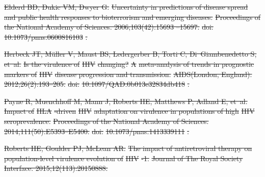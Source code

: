 \documentclass[10pt,letterpaper]{article}
\providecommand{\DIFdeltex}[1]{{\protect\color{red}\sout{#1}}}                      %
\providecommand{\DIFaddbegin}{} %
\providecommand{\DIFaddend}{} %
\providecommand{\DIFdelend}{} %
\providecommand{\DIFdel}[1]{\texorpdfstring{\DIFdeltex{#1}}{}} %
\newcommand{\DIFaddincludegraphics}[2][]{{\color{blue}\fbox{\DIFOincludegraphics[#1]{#2}}}} %
\DeclareRobustCommand{\DIFaddbegin}{\DIFOaddbegin \let\includegraphics\DIFaddincludegraphics} %
\DeclareRobustCommand{\DIFaddend}{\DIFOaddend \let\includegraphics\DIFOincludegraphics} %
\DeclareRobustCommand{\DIFdelend}{\DIFOaddend \let\includegraphics\DIFOincludegraphics} %
\begin{document}
\DIFdel{Elderd BD, Dukic VM, Dwyer G.
}%
\DIFdel{Uncertainty in predictions of disease spread and public health
  responses to bioterrorism and emerging diseases.
}%
\DIFdel{Proceedings of the National Academy of Sciences.
2006;103(42):15693
  --15697.
}%
\DIFdel{doi:}%
\DIFdel{10.1073/pnas.0600816103}%
\DIFdel{.
}%

\DIFdel{Herbeck JT, Müller V, Maust BS, Ledergerber B, Torti C, Di~Giambenedetto S,
  et~al.
}%
\DIFdel{Is the virulence of
}%
\DIFdel{HIV}%
\DIFdel{changing? }%
\DIFdel{A}%
\DIFdel{meta-analysis of trends in prognostic markers of }%
\DIFdel{HIV}%
\DIFdel{disease progression and transmission.
}%
\DIFdel{AIDS(London, England).
2012;26(2):193--205.
}%
\DIFdel{doi:}%
\DIFdel{10.1097/QAD.0b013e32834db418}%
\DIFdel{.
}%

\DIFdel{Payne R, Muenchhoff M, Mann J, Roberts HE, Matthews P, Adland E, et~al.
}%
\DIFdel{Impact of }%
\DIFdel{HLA}%
\DIFdel{-driven }%
\DIFdel{HIV}%
\DIFdel{adaptation on virulence in populations
  of high }%
\DIFdel{HIV}%
\DIFdel{seroprevalence.
}%
\DIFdel{Proceedings of the National Academy of Sciences.
  2014;111(50):E5393--E5400.
}%
\DIFdel{doi:}%
\DIFdel{10.1073/pnas.1413339111}%
\DIFdel{.
}%

\DIFdel{Roberts HE, Goulder PJ, McLean AR.
}%
\DIFdel{The impact of antiretroviral therapy on population-level virulence
  evolution of }%
\DIFdel{HIV}%
\DIFdel{-1.
}%
\DIFdel{Journal of The Royal Society Interface. 2015;12(113):20150888.
}%


\DIFdelend \DIFaddbegin 
 \DIFaddend
\end{document}
